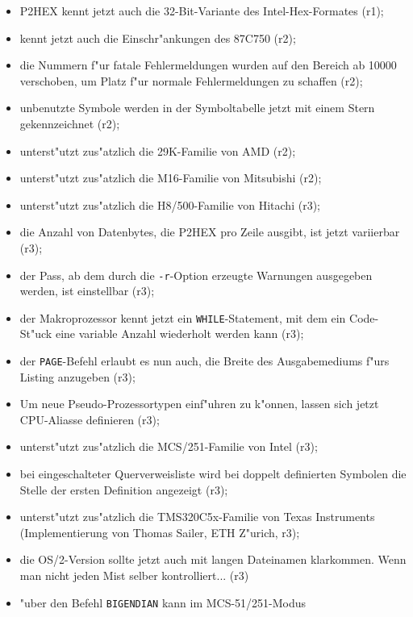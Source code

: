 \documentclass[12pt,a4paper,twoside]{report}
\newcommand{\tty}[1]{{\tt #1}}
\begin{document}
\begin{itemize}
{\begin{itemize}
{            \tty{MOMCPUNAME}, der den Prozessornamen im Volltext enth"alt (r1).}
      \item{P2HEX kennt jetzt auch die 32-Bit-Variante des
            Intel-Hex-Formates (r1);}
      \item{kennt jetzt auch die Einschr"ankungen des 87C750 (r2);}
      \item{die Nummern f"ur fatale Fehlermeldungen wurden auf den Bereich
            ab 10000 verschoben, um Platz f"ur normale Fehlermeldungen zu
	    schaffen (r2);}
      \item{unbenutzte Symbole werden in der Symboltabelle jetzt mit einem
            Stern gekennzeichnet (r2);}
      \item{unterst"utzt zus"atzlich die 29K-Familie von AMD (r2);}
      \item{unterst"utzt zus"atzlich die M16-Familie von Mitsubishi (r2);}
      \item{unterst"utzt zus"atzlich die H8/500-Familie von Hitachi (r3);}
      \item{die Anzahl von Datenbytes, die P2HEX pro Zeile ausgibt, ist
            jetzt variierbar (r3);}
      \item{der Pass, ab dem durch die \tty{-r}-Option erzeugte Warnungen
            ausgegeben werden, ist einstellbar (r3);}
      \item{der Makroprozessor kennt jetzt ein \tty{WHILE}-Statement,
            mit dem ein Code-St"uck eine variable Anzahl wiederholt werden
	    kann (r3);}
      \item{der \tty{PAGE}-Befehl erlaubt es nun auch, die Breite des
            Ausgabemediums f"urs Listing anzugeben (r3);}
      \item{Um neue Pseudo-Prozessortypen einf"uhren zu k"onnen, lassen
            sich jetzt CPU-Aliasse definieren (r3);}
      \item{unterst"utzt zus"atzlich die MCS/251-Familie von Intel (r3);}
      \item{bei eingeschalteter Querverweisliste wird bei doppelt
            definierten Symbolen die Stelle der ersten Definition
	    angezeigt (r3);}
      \item{unterst"utzt zus"atzlich die TMS320C5x-Familie von Texas
            Instruments (Implementierung von Thomas Sailer, ETH Z"urich,
            r3);}
      \item{die OS/2-Version sollte jetzt auch mit langen Dateinamen
            klarkommen.  Wenn man nicht jeden Mist selber kontrolliert...
	    (r3)}
      \item{"uber den Befehl \tty{BIGENDIAN} kann im MCS-51/251-Modus
}
\end{itemize}}
\end{itemize}
\end{document}
